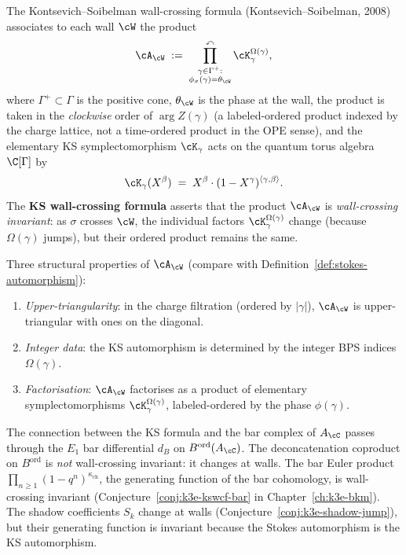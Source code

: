 \begin{definition}
\label{def:ks-wall-crossing}
%
The Kontsevich--Soibelman wall-crossing formula (Kontsevich--Soibelman, 2008) associates to each wall $\cW$ the product
\begin{equation}
\label{eq:ks-wall-product}
 \cA_\cW \;:=\; \prod_{\substack{\gamma \in \Gamma^+:\\ \phi_\sigma(\gamma) = \theta_\cW}}^{\curvearrowleft} \cK_\gamma^{\Omega(\gamma)},
\end{equation}
where $\Gamma^+ \subset \Gamma$ is the positive cone, $\theta_\cW$ is the phase at the wall, the product is taken in the \emph{clockwise} order of $\arg Z(\gamma)$ (a labeled-ordered product indexed by the charge lattice, not a time-ordered product in the OPE sense), and the elementary KS symplectomorphism $\cK_\gamma$ acts on the quantum torus algebra $\C[\Gamma]$ by
\[
 \cK_\gamma(X^\beta) \;=\; X^\beta \cdot (1 - X^\gamma)^{\langle \gamma, \beta \rangle}.
\]
The \textbf{KS wall-crossing formula} asserts that the product $\cA_\cW$ is \emph{wall-crossing invariant}: as $\sigma$ crosses $\cW$, the individual factors $\cK_\gamma^{\Omega(\gamma)}$ change (because $\Omega(\gamma)$ jumps), but their ordered product remains the same.

Three structural properties of $\cA_\cW$ (compare with Definition~\ref{def:stokes-automorphism}):
\begin{enumerate}[label=\textup{(\alph*)}]
 \item \emph{Upper-triangularity}: in the charge filtration (ordered by $|\gamma|$), $\cA_\cW$ is upper-triangular with ones on the diagonal.
 \item \emph{Integer data}: the KS automorphism is determined by the integer BPS indices $\Omega(\gamma)$.
 \item \emph{Factorisation}: $\cA_\cW$ factorises as a product of elementary symplectomorphisms $\cK_\gamma^{\Omega(\gamma)}$, labeled-ordered by the phase $\phi(\gamma)$.
\end{enumerate}
\end{definition}

\begin{remark}
\label{rem:bar-diff-wc}
The connection between the KS formula and the bar complex of $A_\cC$ passes through the $E_1$ bar differential $d_B$ on $B^{\mathrm{ord}}(A_\cC)$. The deconcatenation coproduct on $B^{\mathrm{ord}}$ is \emph{not} wall-crossing invariant: it changes at walls. The bar Euler product $\prod_{n \geq 1} (1 - q^n)^{\kappa_{\mathrm{ch}}}$, the generating function of the bar cohomology, is wall-crossing invariant (Conjecture~\ref{conj:k3e-kswcf-bar} in Chapter~\ref{ch:k3e-bkm}). The shadow coefficients $S_k$ change at walls (Conjecture~\ref{conj:k3e-shadow-jump}), but their generating function is invariant because the Stokes automorphism is the KS automorphism.
\end{remark}

